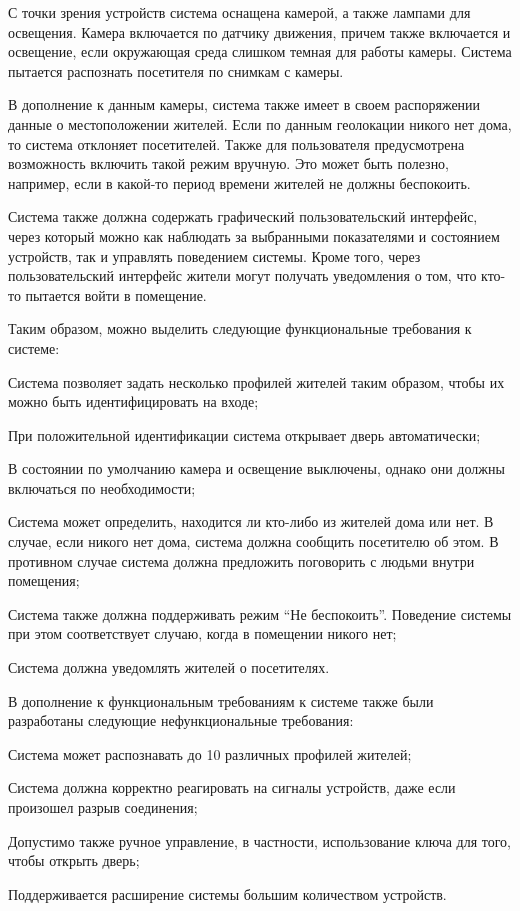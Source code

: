 С точки зрения устройств система оснащена камерой, а также лампами для освещения. Камера включается по датчику движения, причем также включается и освещение, если окружающая среда слишком темная для работы камеры. Система пытается распознать посетителя по снимкам с камеры.

В дополнение к данным камеры, система также имеет в своем распоряжении данные о местоположении жителей. Если по данным геолокации никого нет дома, то система отклоняет посетителей. Также для пользователя предусмотрена возможность включить такой режим вручную. Это может быть полезно, например, если в какой-то период времени жителей не должны беспокоить.

Система также должна содержать графический пользовательский интерфейс, через который можно как наблюдать за выбранными показателями и состоянием устройств, так и управлять поведением системы. Кроме того, через пользовательский интерфейс жители могут получать уведомления о том, что кто-то пытается войти в помещение.

Таким образом, можно выделить следующие функциональные требования к системе:

\begin{textitemize}
	\item Система позволяет задать несколько профилей жителей таким образом, чтобы их можно быть идентифицировать на входе;
	\item При положительной идентификации система открывает дверь автоматически;
	\item В состоянии по умолчанию камера и освещение выключены, однако они должны включаться по необходимости;
	\item Система может определить, находится ли кто-либо из жителей дома или нет. В случае, если никого нет дома, система должна сообщить посетителю об этом. В противном случае система должна предложить поговорить с людьми внутри помещения;
	\item Система также должна поддерживать режим ``Не беспокоить''. Поведение системы при этом соответствует случаю, когда в помещении никого нет;
	\item Система должна уведомлять жителей о посетителях.
\end{textitemize}

В дополнение к функциональным требованиям к системе также были разработаны следующие нефункциональные требования:

\begin{textitemize}
	\item Система может распознавать до 10 различных профилей жителей;
	\item Система должна корректно реагировать на сигналы устройств, даже если произошел разрыв соединения;
	\item Допустимо также ручное управление, в частности, использование ключа для того, чтобы открыть дверь;
	\item Поддерживается расширение системы большим количеством устройств.
\end{textitemize}


